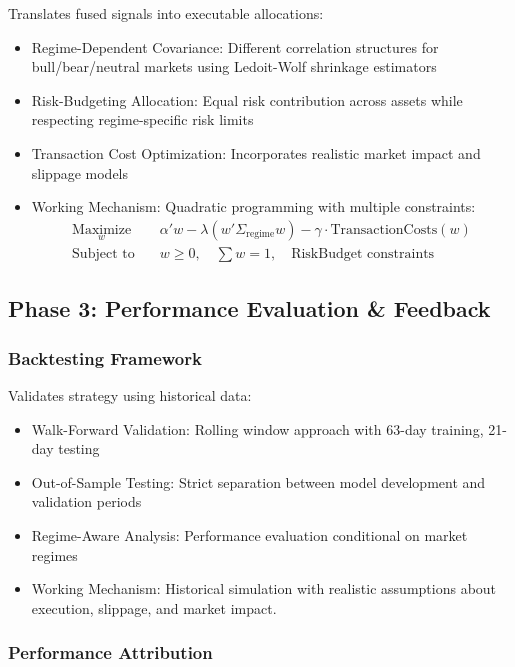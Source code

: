 \documentclass{singlecol-new}
\theoremstyle{TH}{
\newtheorem{lemma}{Lemma}
\newtheorem{theorem}[lemma]{Theorem}
\newtheorem{corrolary}[lemma]{Corrolary}
\newtheorem{conjecture}[lemma]{Conjecture}
\newtheorem{proposition}[lemma]{Proposition}
\newtheorem{claim}[lemma]{Claim}
\newtheorem{stheorem}[lemma]{Wrong Theorem}
\newtheorem{algorithm}{Algorithm}
}
\theoremstyle{THrm}{
\newtheorem{definition}{Definition}[section]
\newtheorem{question}{Question}[section]
\newtheorem{remark}{Remark}
\newtheorem{scheme}{Scheme}
}
\theoremstyle{THhit}{
\newtheorem{case}{Case}[section]
}
\begin{document}
Translates fused signals into executable allocations:
\begin{itemize}
    \item Regime-Dependent Covariance: Different correlation structures for bull/bear/neutral markets using Ledoit-Wolf shrinkage estimators
    \item Risk-Budgeting Allocation: Equal risk contribution across assets while respecting regime-specific risk limits
    \item Transaction Cost Optimization: Incorporates realistic market impact and slippage models
    \item Working Mechanism: Quadratic programming with multiple constraints:
    \begin{align}
\underset{w}{\text{Maximize}} \quad & \alpha'w - \lambda(w'\Sigma_{\text{regime}} w) - \gamma \cdot \text{TransactionCosts}(w) \\
\text{Subject to} \quad & w \geq 0, \quad \sum w = 1, \quad \text{RiskBudget constraints}
\end{align}
\end{itemize}



\subsection{Phase 3: Performance Evaluation & Feedback}
\subsubsection{Backtesting Framework}
Validates strategy using historical data:
\begin{itemize}
    \item Walk-Forward Validation: Rolling window approach with 63-day training, 21-day testing
    \item Out-of-Sample Testing: Strict separation between model development and validation periods
    \item Regime-Aware Analysis: Performance evaluation conditional on market regimes
    \item Working Mechanism: Historical simulation with realistic assumptions about execution, slippage, and market impact.
\end{itemize}

\subsubsection{Performance Attribution}
\end{document}

